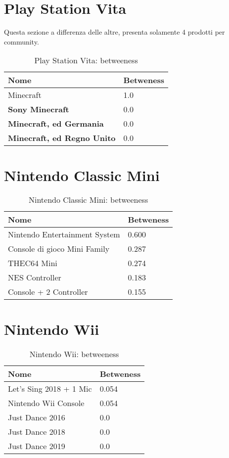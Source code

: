 \pagebreak

	\section{Play Station Vita}
		Questa sezione a differenza delle altre, presenta solamente 4 prodotti per community.
		\begin{table}[H]
			\caption{Play Station Vita: betweeness}
			\label{tab:psvita}
			\centering
			\begin{tabular}{ll}
				\toprule 
				\textbf{Nome} & \textbf{Betweness} \\
				\midrule
				Minecraft & 1.0 \\
				\textbf{Sony Minecraft} & 0.0 \\
				\textbf{Minecraft, ed Germania} & 0.0 \\
				\textbf{Minecraft, ed Regno Unito} & 0.0 \\
				\bottomrule
			\end{tabular}
		\end{table}
	
	\section{Nintendo Classic Mini}
		\begin{table}[H]
			\caption{Nintendo Classic Mini: betweeness}
			\label{tab:nintendoclassicmini}
			\centering
			\begin{tabular}{ll}
				\toprule 
				\textbf{Nome} & \textbf{Betweness} \\
				\midrule
				Nintendo Entertainment System & 0.600\\
				Console di gioco Mini Family & 0.287 \\
				THEC64 Mini & 0.274 \\
				NES Controller & 0.183 \\
			    Console + 2 Controller & 0.155 \\		
				\bottomrule
			\end{tabular}
		\end{table}
			
		\section{Nintendo Wii}
			\begin{table}[H]
				\caption{Nintendo Wii: betweeness}
				\label{tab:wii}
				\centering
				\begin{tabular}{ll}
					\toprule 
					\textbf{Nome} & \textbf{Betweness} \\
					\midrule
					Let's Sing 2018 + 1 Mic & 0.054 \\
					Nintendo Wii Console & 0.054 \\
					Just Dance 2016 & 0.0 \\
					Just Dance 2018 & 0.0 \\
					Just Dance 2019 & 0.0 \\		
					\bottomrule
				\end{tabular}
			\end{table}
		
